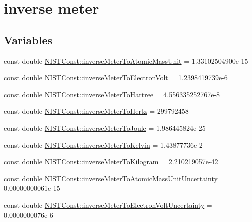 \hypertarget{group___n_i_s_t_const-_inverse_meter}{}\section{inverse meter}
\label{group___n_i_s_t_const-_inverse_meter}
\subsection*{Variables}
\begin{DoxyCompactItemize}
\item 
const double \hyperlink{group___n_i_s_t_const-_inverse_meter_ga7d76b1c26bd9b6226d0bdbcbfe44c3a0}{N\+I\+S\+T\+Const\+::inverse\+Meter\+To\+Atomic\+Mass\+Unit} = 1.\+33102504900e-\/15
\item 
const double \hyperlink{group___n_i_s_t_const-_inverse_meter_gafdede27a7699d3a180bb829b65fac447}{N\+I\+S\+T\+Const\+::inverse\+Meter\+To\+Electron\+Volt} = 1.\+2398419739e-\/6
\item 
const double \hyperlink{group___n_i_s_t_const-_inverse_meter_ga6f47bdfe8997031b0f15229eb5bf4b9e}{N\+I\+S\+T\+Const\+::inverse\+Meter\+To\+Hartree} = 4.\+556335252767e-\/8
\item 
const double \hyperlink{group___n_i_s_t_const-_inverse_meter_ga5743c27316774c4f065336d0a016508e}{N\+I\+S\+T\+Const\+::inverse\+Meter\+To\+Hertz} = 299792458
\item 
const double \hyperlink{group___n_i_s_t_const-_inverse_meter_gaa927232a822dccc33f7c56ac002aff52}{N\+I\+S\+T\+Const\+::inverse\+Meter\+To\+Joule} = 1.\+986445824e-\/25
\item 
const double \hyperlink{group___n_i_s_t_const-_inverse_meter_gaf5a61f53f6757db329df597b76b2df69}{N\+I\+S\+T\+Const\+::inverse\+Meter\+To\+Kelvin} = 1.\+43877736e-\/2
\item 
const double \hyperlink{group___n_i_s_t_const-_inverse_meter_ga6b5807b2161fa29684e4862e575b9102}{N\+I\+S\+T\+Const\+::inverse\+Meter\+To\+Kilogram} = 2.\+210219057e-\/42
\item 
const double \hyperlink{group___n_i_s_t_const-_inverse_meter_ga19f65e8c675ab4bbf77f2d7fcc27dec8}{N\+I\+S\+T\+Const\+::inverse\+Meter\+To\+Atomic\+Mass\+Unit\+Uncertainty} = 0.\+00000000061e-\/15
\item 
const double \hyperlink{group___n_i_s_t_const-_inverse_meter_gaffb7462545a03fb13544c9f65d77dc7e}{N\+I\+S\+T\+Const\+::inverse\+Meter\+To\+Electron\+Volt\+Uncertainty} = 0.\+0000000076e-\/6
\item 

\end{DoxyCompactItemize}

